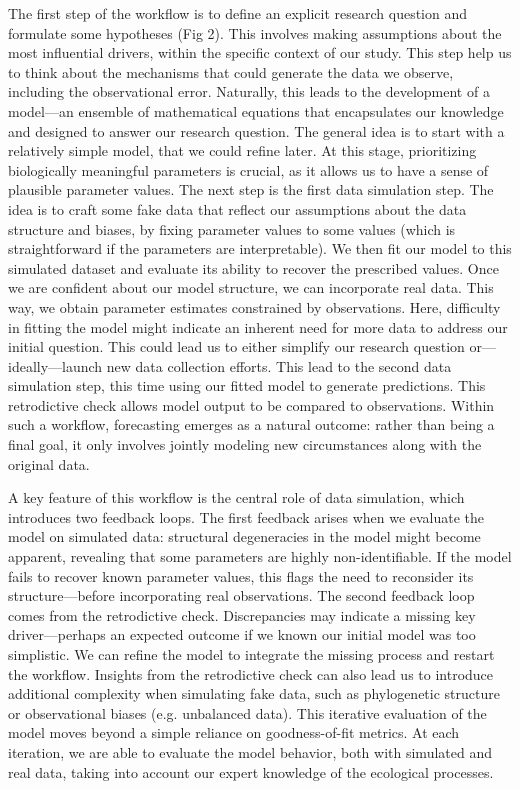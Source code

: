 \documentclass[11pt]{article}
\begin{document}
The first step of the workflow is to define an explicit research question and formulate some hypotheses (Fig 2). This involves making assumptions about the most influential drivers, within the specific context of our study. This step help us to think about the mechanisms that could generate the data we observe, including the observational error. Naturally, this leads to the development of a model---an ensemble of mathematical equations that encapsulates our knowledge and designed to answer our research question. The general idea is to start with a relatively simple model, that we could refine later. At this stage, prioritizing biologically meaningful parameters is crucial, as it allows us to have a sense of plausible parameter values. 
The next step is the first data simulation step. The idea is to craft some fake data that reflect our assumptions about the data structure and biases, by fixing parameter values to some values (which is straightforward if the parameters are interpretable). We then fit our model to this simulated dataset and evaluate its ability to recover the prescribed values. 
Once we are confident about our model structure, we can incorporate real data. This way, we obtain parameter estimates constrained by observations. Here, difficulty in fitting the model might indicate an inherent need for more data to address our initial question. This could lead us to either simplify our research question or---ideally---launch new data collection efforts. This lead to the second data simulation step, this time using our fitted model to generate predictions. This retrodictive check allows model output to be compared to observations. 
Within such a workflow, forecasting emerges as a natural outcome: rather than being a final goal, it only involves jointly modeling new circumstances along with the original data.

A key feature of this workflow is the central role of data simulation, which introduces two feedback loops. The first feedback arises when we evaluate the model on simulated data: structural degeneracies in the model might become apparent, revealing that some parameters are highly non-identifiable. If the model fails to recover known parameter values, this flags %
the need to reconsider its structure---before incorporating real observations. 
The second feedback loop comes from the retrodictive check. 
Discrepancies may indicate a missing key driver---perhaps an expected outcome if we known our initial model was too simplistic. We can refine the model to integrate the missing process and restart the workflow. Insights from the retrodictive check can also lead us to introduce additional complexity when simulating fake data, such as phylogenetic structure or observational biases (e.g. unbalanced data). This iterative evaluation of the model moves beyond a simple reliance on goodness-of-fit metrics. At each iteration, we are able to evaluate the model behavior, both with simulated and real data, taking into account our expert knowledge of the ecological processes. 
\end{document}
